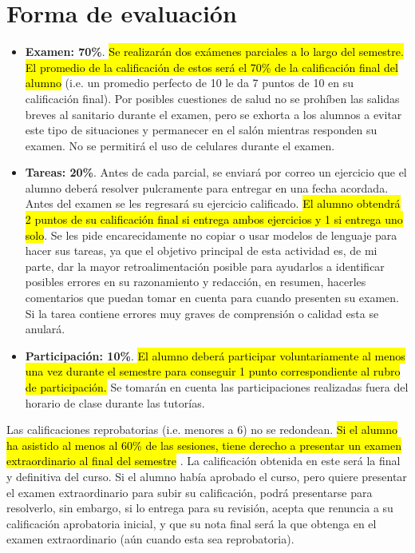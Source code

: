 \documentclass[10pt]{extreport}
\begin{document}
\section{Forma de evaluación}
\begin{itemize}
    \item \textbf{Examen: 70\%}.
    \hl{Se realizarán dos exámenes parciales a lo largo del semestre.
    El promedio de la calificación de estos será el
    70\% de la calificación final del alumno} (i.e. un promedio perfecto
    de 10 le da 7 puntos de 10 en su calificación final).
    Por posibles cuestiones de salud
    no se prohíben las salidas breves al sanitario durante el examen, pero
    se exhorta a los alumnos a evitar este tipo de situaciones y permanecer en
    el salón mientras responden su examen. No se permitirá el uso de celulares
    durante el examen.

    \item \textbf{Tareas: 20\%}.
    Antes de cada parcial, se enviará por correo un ejercicio que el alumno deberá 
    resolver
    pulcramente para entregar en una fecha acordada. Antes del examen se les
    regresará su ejercicio calificado. \hl{El alumno obtendrá 2 puntos de
    su calificación final si entrega ambos ejercicios y 1 si entrega uno solo}.
    Se les pide encarecidamente no copiar
    o usar modelos de lenguaje para hacer sus tareas, ya que el objetivo
    principal de esta actividad es, de mi parte,
    dar la mayor retroalimentación posible para ayudarlos
    a identificar posibles
    errores en su razonamiento y redacción,
    en resumen, hacerles comentarios que puedan tomar en cuenta
    para cuando presenten su examen. Si la tarea contiene errores muy graves
    de comprensión o calidad esta se anulará.

    \item \textbf{Participación: 10\%}.
    \hl{El alumno deberá participar voluntariamente
    al menos una vez durante el semestre
    para conseguir 1 punto correspondiente al rubro de participación.}
    Se tomarán en cuenta las participaciones
    realizadas fuera del horario de clase durante las tutorías.
\end{itemize}

Las calificaciones reprobatorias
(i.e. menores a 6) no se redondean. 
\hl{Si el alumno 
	ha asistido al menos al 60\% de las sesiones,
	tiene derecho a presentar
	un examen extraordinario al final del semestre}
. La calificación obtenida
en este será la final y definitiva del curso.
Si el alumno había aprobado el curso, pero
quiere presentar el examen extraordinario para subir su calificación,
podrá presentarse para resolverlo, sin embargo, si lo entrega para
su revisión, acepta que renuncia
a su calificación aprobatoria inicial, y que su nota final será la que
obtenga en el examen extraordinario (aún cuando esta sea reprobatoria).
\end{document}
